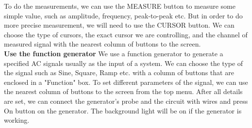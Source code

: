 \phantom{ } To do the measurements, we can use the MEASURE button to measure some simple value, such as amplitude, frequency, peak-to-peak etc. But in order to do more precise measurement, we will need to use the CURSOR button. We can choose the type of cursors, the exact cursor we are controlling, and the channel of measured signal with the nearest column of buttons to the screen.\\
\textbf{Use the function generator} \newline
\phantom{ } We use a function generator to generate a specified AC signals usually as the input of a system. We can choose the type of the signal such as Sine, Square, Ramp etc. with a column of buttons that are enclosed in a "Function" box. To set different parameters of the signal, we can use the nearest column of buttons to the screen from the top menu. After all details are set, we can connect the generator's probe and the circuit with wires and press On button on the generator. The background light will be on if the generator is working.\\